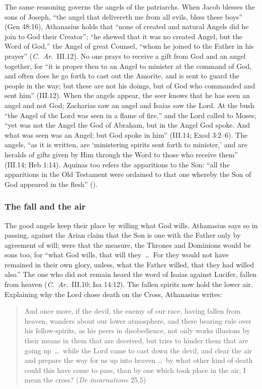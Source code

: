The same reasoning governs the angels of the patriarchs. When Jacob
blesses the sons of Joseph, ``the angel that delivereth me from all
evils, bless these boys'' (Gen 48:16), Athanasius holds that ``none of
created and natural Angels did he join to God their Creator''; ``he
shewed that it was no created Angel, but the Word of God,'' the Angel of
great Counsel, ``whom he joined to the Father in his prayer'' (\emph{C.\
Ar.}\ III.12). No one prays to receive a gift from God and an angel
together, for ``it is proper then to an Angel to minister at the command
of God, and often does he go forth to cast out the Amorite, and is sent
to guard the people in the way; but these are not his doings, but of God
who commanded and sent him'' (III.12). When the angels appear, the
seer knows that he has seen an angel and not God; Zacharias saw an angel
and Isaias saw the Lord. At the bush ``the Angel of the Lord was seen in a
flame of fire,'' and the Lord called to Moses; ``yet was not the Angel
the God of Abraham, but in the Angel God spoke. And what was seen was an
Angel; but God spoke in him'' (III.14; Exod 3:2--6). The angels, ``as it
is written, are `ministering spirits sent forth to minister,' and are
heralds of gifts given by Him through the Word to those who receive
them'' (III.14; Heb 1:14). Aquinas too refers the apparitions to the Son:
``all the apparitions in the Old Testament were ordained to that one
whereby the Son of God appeared in the flesh'' ().

\subsubsection{The fall and the air}

The good angels keep their place by willing what God wills. Athanasius
says so in passing, against the Arian claim that the Son is one with the
Father only by agreement of will; were that the measure, the Thrones and
Dominions would be sons too, for ``what God wills, that will they~\dots\
For they would not have remained in their own glory, unless, what the
Father willed, that they had willed also.'' The one who did not remain
heard the word of Isaias against Lucifer, fallen from heaven (\emph{C.\
Ar.}\ III.10; Isa 14:12). The fallen spirits now hold the lower air.
Explaining why the Lord chose death on the Cross, Athanasius writes:

\begin{quote}
And once more, if the devil, the enemy of our race, having fallen from
heaven, wanders about our lower atmosphere, and there bearing rule over
his fellow-spirits, as his peers in disobedience, not only works
illusions by their means in them that are deceived, but tries to hinder
them that are going up~\dots\ while the Lord came to cast down the
devil, and clear the air and prepare the way for us up into heaven
\dots\ by what other kind of death could this have come to pass, than by
one which took place in the air, I mean the cross? (\emph{De
incarnatione} 25.5)
\end{quote}

